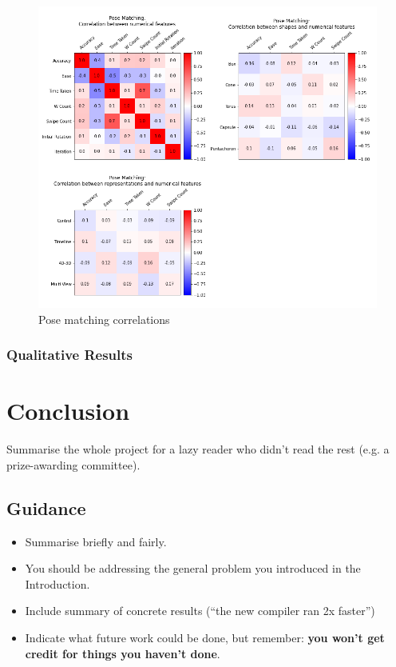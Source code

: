 \documentclass{l4proj}
\begin{document}
\begin{figure}
  \includegraphics[width=\textwidth]{images/results/pose_matching_correlations.png}
  \caption{Pose matching correlations}
  \label{fig:shape_corr}
\end{figure}

\citep{glen_jaccard_2022}

\subsection{Qualitative Results}


\chapter{Conclusion}    
Summarise the whole project for a lazy reader who didn't read the rest (e.g. a prize-awarding committee).
\section{Guidance}
\begin{itemize}
    \item
        Summarise briefly and fairly.
    \item
        You should be addressing the general problem you introduced in the
        Introduction.        
    \item
        Include summary of concrete results (``the new compiler ran 2x
        faster'')
    \item
        Indicate what future work could be done, but remember: \textbf{you
        won't get credit for things you haven't done}.
\end{itemize}
\end{document}
